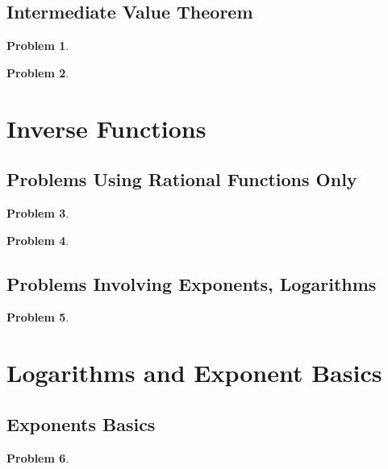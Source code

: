 \documentclass{article}
\newtheorem{problem}{Problem}
\begin{document}
\subsection{Intermediate Value Theorem}\label{secMPSintermediateValueTheorem}
\begin{problem}

\end{problem}

\begin{problem}

\end{problem}

\section{Inverse Functions}\label{secMPSInverseFunctions}

\subsection{Problems Using Rational Functions Only}
\begin{problem}

\end{problem}


\begin{problem}

\end{problem}

\subsection{Problems Involving Exponents, Logarithms}
\begin{problem}

\end{problem}


\section{Logarithms and Exponent Basics}\label{secMPSLogarithmsExponentsBasics}
\subsection{Exponents Basics}
\begin{problem}

\end{problem}

\end{document}

